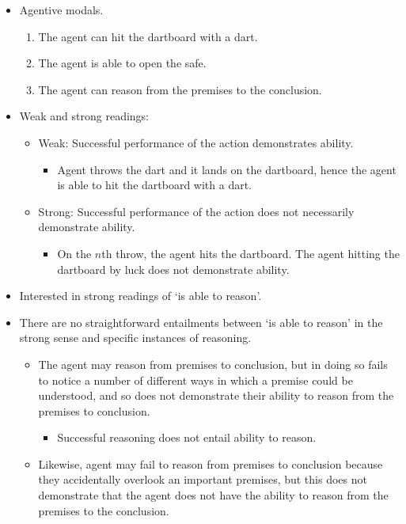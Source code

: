 \documentclass[10pt]{article}
\begin{document}
\begin{itemize}
\item Agentive modals.
  \begin{enumerate}
  \item The agent can hit the dartboard with a dart.
  \item The agent is able to open the safe.
  \item The agent can reason from the premises to the conclusion.
  \end{enumerate}
\item Weak and strong readings:
  \begin{itemize}
  \item Weak: Successful performance of the action demonstrates ability.
    \begin{itemize}
    \item Agent throws the dart and it lands on the dartboard, hence the agent is able to hit the dartboard with a dart.
    \end{itemize}
  \item Strong: Successful performance of the action does not necessarily demonstrate ability.
    \begin{itemize}
    \item On the \(n\)th throw, the agent hits the dartboard.
      The agent hitting the dartboard by luck does not demonstrate ability.
    \end{itemize}
  \end{itemize}
\item Interested in strong readings of `is able to reason'.
\item There are no straightforward entailments between `is able to reason' in the strong sense and specific instances of reasoning.
  \begin{itemize}
  \item The agent may reason from premises to conclusion, but in doing so fails to notice a number of different ways in which a premise could be understood, and so does not demonstrate their ability to reason from the premises to conclusion.
    \begin{itemize}
    \item Successful reasoning does not entail ability to reason.
    \end{itemize}
  \item Likewise, agent may fail to reason from premises to conclusion because they accidentally overlook an important premises, but this does not demonstrate that the agent does not have the ability to reason from the premises to the conclusion.

\end{itemize}
\end{itemize}
\end{document}
